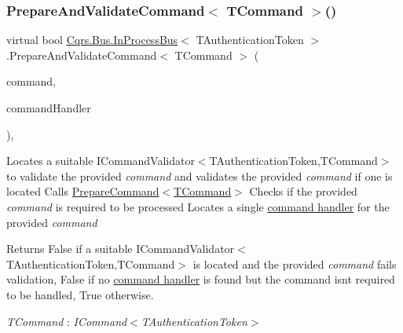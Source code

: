 \subsubsection{\texorpdfstring{Prepare\+And\+Validate\+Command$<$ T\+Command $>$()}{PrepareAndValidateCommand< TCommand >()}}
{\footnotesize\ttfamily virtual bool \hyperlink{classCqrs_1_1Bus_1_1InProcessBus}{Cqrs.\+Bus.\+In\+Process\+Bus}$<$ T\+Authentication\+Token $>$.Prepare\+And\+Validate\+Command$<$ T\+Command $>$ (\begin{DoxyParamCaption}\item[{T\+Command}]{command,  }\item[{out \hyperlink{classCqrs_1_1Bus_1_1RouteHandlerDelegate}{Route\+Handler\+Delegate}}]{command\+Handler }\end{DoxyParamCaption})\hspace{0.3cm}{\ttfamily [protected]}, {\ttfamily [virtual]}}



Locates a suitable I\+Command\+Validator$<$\+T\+Authentication\+Token,\+T\+Command$>$ to validate the provided {\itshape command}  and validates the provided {\itshape command}  if one is located Calls \hyperlink{classCqrs_1_1Bus_1_1InProcessBus_ab0064808b1b619bee57fa5eff49bfca7}{Prepare\+Command$<$\+T\+Command$>$} Checks if the provided {\itshape command}  is required to be processed Locates a single \hyperlink{classCqrs_1_1Bus_1_1RouteHandlerDelegate}{command handler} for the provided {\itshape command}  

\begin{DoxyReturn}{Returns}
False if a suitable I\+Command\+Validator$<$\+T\+Authentication\+Token,\+T\+Command$>$ is located and the provided {\itshape command}  fails validation, False if no \hyperlink{classCqrs_1_1Bus_1_1RouteHandlerDelegate}{command handler} is found but the command isn\textquotesingle{}t required to be handled, True otherwise. 
\end{DoxyReturn}
\begin{Desc}
\item[Type Constraints]\begin{description}
\item[{\em T\+Command} : {\em I\+Command$<$T\+Authentication\+Token$>$}]\end{description}
\end{Desc}
\mbox{\label{classCqrs_1_1Bus_1_1InProcessBus_ab0064808b1b619bee57fa5eff49bfca7}} 

